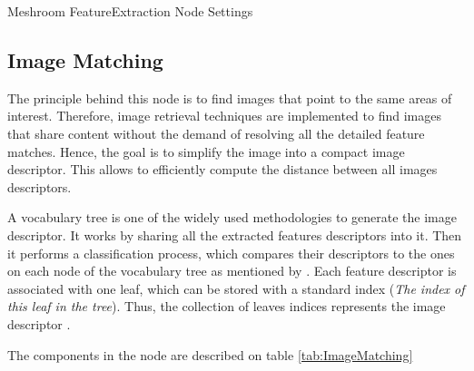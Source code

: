 \documentclass[12pt]{report}
\begin{document}
  \begin{table}[H]
    \centering
    \caption{Meshroom FeatureExtraction Node Settings}
    \label{tab:FeatureExtraction}
    \end{table}
  
  
    \subsection{Image Matching}
    The principle behind this node is to find images that point to the same areas of interest. Therefore, image retrieval techniques are implemented to find images 
    that share content without the demand of resolving all the detailed feature matches. Hence, the goal is to simplify the image into a compact image descriptor. This allows to efficiently compute the distance between all images descriptors.
    
    A vocabulary tree is one of the widely used methodologies to generate the image descriptor. It works by sharing all the extracted features descriptors into it. Then it performs a classification process, which compares their descriptors to the ones on each node of the vocabulary tree as mentioned by .
    Each feature descriptor is associated with one leaf, which can be stored with a standard index (\textit{The index of this leaf in the tree}). Thus, the collection of leaves indices represents the image descriptor .
    
    The components in the node are described on table \ref{tab:ImageMatching}
    
\end{document}
